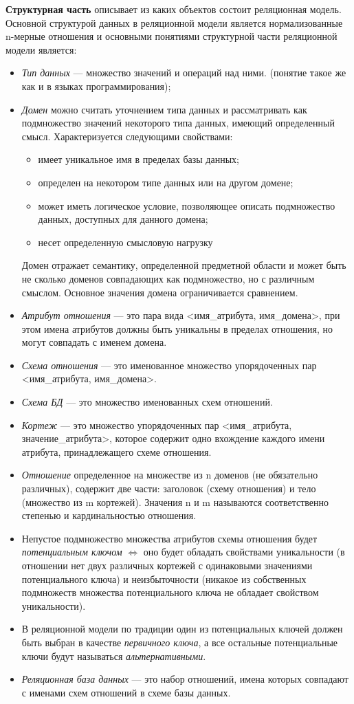 \textbf{Структурная часть} описывает из каких объектов состоит реляционная модель. Основной структурой данных в реляционной модели является нормализованные n-мерные отношения и основными понятиями структурной части реляционной модели является:
\begin{itemize}
	\item \textit{Тип данных} --- множество значений и операций над ними. (понятие такое же как и в языках программирования);
	\item \textit{Домен} можно считать уточнением типа данных и рассматривать как подмножество значений некоторого типа данных, имеющий определенный смысл. 
	Характеризуется следующими свойствами:
	\begin{itemize}
		\item имеет уникальное имя в пределах базы данных;
		\item определен на некотором типе данных или на другом домене;
		\item может иметь логическое условие, позволяющее описать подмножество данных, доступных для данного домена;
		\item несет определенную смысловую нагрузку
	\end{itemize}
	Домен отражает семантику, определенной предметной области и может быть не сколько доменов совпадающих как подмножество, но с различным смыслом. Основное значения домена ограничивается сравнением.
	\item \textit{Атрибут отношения} --- это пара вида <имя\_атрибута, имя\_домена>, при этом имена атрибутов должны быть уникальны в пределах отношения, но могут совпадать с именем домена.
	\item \textit{Схема отношения} --- это именованное множество упорядоченных пар <имя\_атрибута, имя\_домена>.
	\item \textit{Схема БД} --- это множество именованных схем отношений.
	\item \textit{Кортеж} --- это множество упорядоченных пар <имя\_атрибута, значение\_атрибута>, которое содержит одно вхождение каждого имени атрибута, принадлежащего схеме отношения.
	\item \textit{Отношение} определенное на множестве из n доменов (не обязательно различных), содержит две части: заголовок (схему отношения) и тело (множество из m кортежей). Значения n и m называются соответственно степенью и кардинальностью отношения.
	\item Непустое подмножество множества атрибутов схемы отношения будет \textit{потенциальным ключом} $\Leftrightarrow$ оно будет обладать свойствами уникальности (в отношении нет двух различных кортежей с одинаковыми 
	значениями потенциального ключа) и неизбыточности (никакое из собственных подмножеств множества 
	потенциального ключа не обладает свойством уникальности). 
	\item В реляционной модели по традиции один из потенциальных ключей должен быть выбран в качестве \textit{первичного ключа}, а все остальные потенциальные ключи будут называться \textit{альтернативными}.
	\item \textit{Реляционная база данных} --- это набор отношений, имена которых совпадают с именами схем отношений в схеме базы данных.
\end{itemize}


